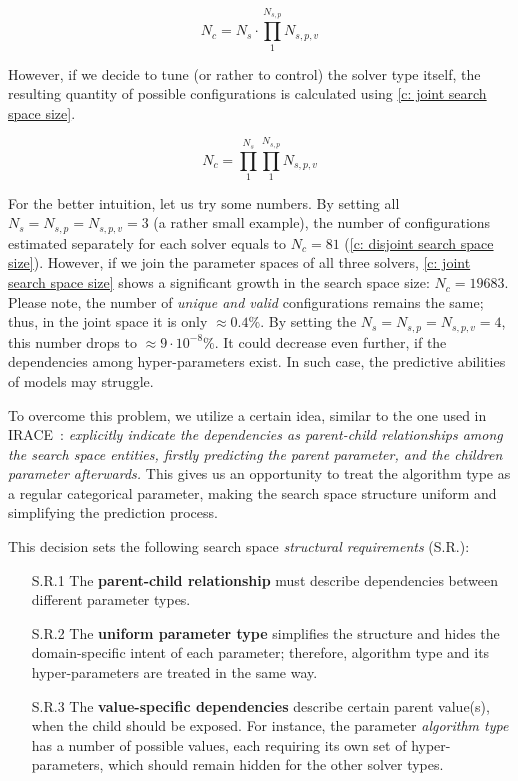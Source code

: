 \begin{equation}
N_c = N_s \cdot \prod_{1}^{N_{s,p}} N_{s,p,v}
\label{c: disjoint search space size}
\end{equation}

However, if we decide to tune (or rather to control) the solver type itself, the resulting quantity of possible configurations is calculated using \cref{c: joint search space size}.

\begin{equation}
N_c = \prod_{1}^{N_{s}} \prod_{1}^{N_{s,p}} N_{s,p,v}
\label{c: joint search space size}
\end{equation}

For the better intuition, let us try some numbers. By setting all $N_s = N_{s,p} = N_{s,p,v} = 3$ (a rather small example), the number of configurations estimated separately for each solver equals to $N_c = 81$ (\cref{c: disjoint search space size}). However, if we join the parameter spaces of all three solvers, \cref{c: joint search space size} shows a significant growth in the search space size: $N_c = 19683$. Please note, the number of \emph{unique and valid} configurations remains the same; thus, in the joint space it is only $\approx 0.4\%$. By setting the $N_s = N_{s,p} = N_{s,p,v} = 4$, this number drops to $\approx 9 \cdot 10^{-8}\%$. It could decrease even further, if the dependencies among hyper-parameters exist. In such case, the predictive abilities of models may struggle.

To overcome this problem, we utilize a certain idea, similar to the one used in IRACE~\cite{lopez2016irace}: \emph{explicitly indicate the dependencies as parent-child relationships among the search space entities, firstly predicting the parent parameter, and the children parameter afterwards.} This gives us an opportunity to treat the algorithm type as a regular categorical parameter, making the search space structure uniform and simplifying the prediction process.

This decision sets the following search space \emph{structural requirements} (S.R.):
\begin{enumerate}
	\item[S.R.1] The \textbf{parent-child relationship} must describe dependencies between different parameter types.

	\item[S.R.2] The \textbf{uniform parameter type} simplifies the structure and hides the domain-specific intent of each parameter; therefore, algorithm type and its hyper-parameters are treated in the same way.

	\item[S.R.3] The \textbf{value-specific dependencies} describe certain parent value(s), when the child should be exposed. For instance, the parameter \textit{algorithm type} has a number of possible values, each requiring its own set of hyper-parameters, which should remain hidden for the other solver types.
\end{enumerate}

